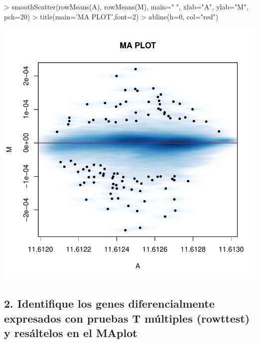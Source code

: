 \documentclass{article}
\begin{document}
\begin{Schunk}
\begin{Sinput}
> smoothScatter(rowMeans(A), rowMeans(M), main=" ", xlab="A", ylab="M", pch=20)
> title(main='MA PLOT',font=2)
> abline(h=0, col="red")
\end{Sinput}
\end{Schunk}
\includegraphics{JuanHenao_Taller3-004}

\subsection*{2. Identifique los genes diferencialmente expresados con pruebas T múltiples (rowttest) y resáltelos en el MAplot}
\end{document}
